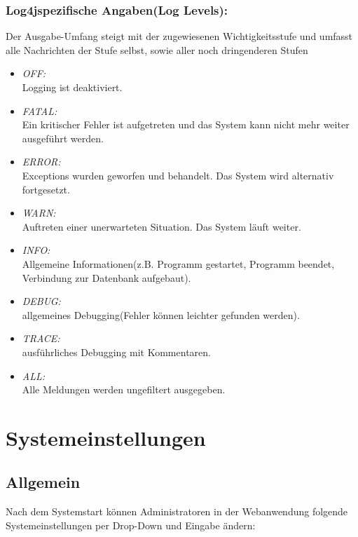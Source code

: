 \subsubsection{Log4jspezifische Angaben(Log Levels):}
Der Ausgabe-Umfang steigt mit der zugewiesenen Wichtigkeitsstufe und umfasst alle Nachrichten der Stufe selbst, sowie aller noch dringenderen Stufen 
\begin{itemize}
	\item \emph{OFF:}\\
	Logging ist deaktiviert.
	\item \emph{FATAL:}\\
	Ein kritischer Fehler ist aufgetreten und das System kann nicht mehr weiter ausgeführt werden.
	\item \emph{ERROR:}\\
	Exceptions wurden geworfen und behandelt. Das System wird alternativ fortgesetzt.
	\item \emph{WARN:}\\
	Auftreten einer unerwarteten Situation. Das System läuft weiter.
	\item \emph{INFO:}\\
	Allgemeine Informationen(z.B. Programm gestartet, Programm beendet, Verbindung zur Datenbank aufgebaut).
	\item \emph{DEBUG:}\\
	allgemeines Debugging(Fehler können leichter gefunden werden).
	\item \emph{TRACE:}\\
	ausführliches Debugging mit Kommentaren.
	\item \emph{ALL:}\\
	Alle Meldungen werden ungefiltert ausgegeben.
\end{itemize}

\section{Systemeinstellungen}
\subsection{Allgemein}
Nach dem Systemstart können Administratoren in der Webanwendung folgende Systemeinstellungen per Drop-Down und Eingabe ändern:

